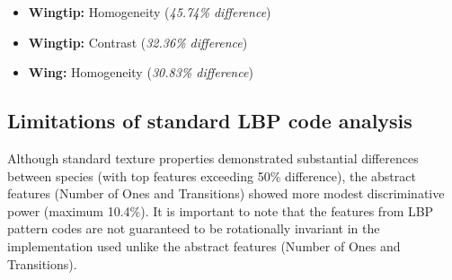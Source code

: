 \documentclass[a4paper,12pt]{report}
\begin{document}
\begin{itemize}
    \item \textbf{Wingtip:} Homogeneity (\textit{45.74\% difference})
    \item \textbf{Wingtip:} Contrast (\textit{32.36\% difference})
    \item \textbf{Wing:} Homogeneity (\textit{30.83\% difference})
\end{itemize}

\subsection{Limitations of standard LBP code analysis}
\label{subsec:feature_limitations}

Although standard texture properties demonstrated substantial differences between species (with top features exceeding 50\% difference), the abstract features (Number of Ones and Transitions) showed more modest discriminative power (maximum 10.4\%). It is important to note that the features from LBP pattern codes are not guaranteed to be rotationally invariant in the implementation used unlike the abstract features (Number of Ones and Transitions).
\end{document}
